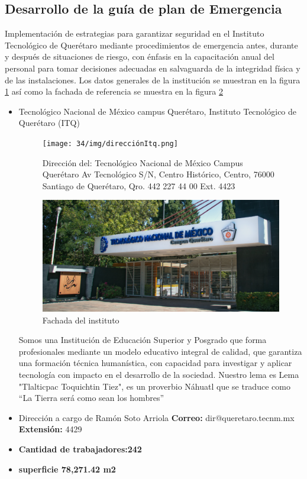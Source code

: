      \subsection{Desarrollo de la guía de plan de Emergencia}
    Implementación de estrategias para garantizar seguridad en el Instituto Tecnológico de Querétaro mediante procedimientos de emergencia antes, durante y después de situaciones de riesgo, con énfasis en la capacitación anual del personal para tomar decisiones adecuadas en salvaguarda de la integridad física y de las instalaciones. Los datos generales de la institución se muestran en la figura \ref{fig:enter-label7} así como la fachada de referencia se muestra en la figura \ref{fig:enter-label8}
    \begin{itemize}
        \item Tecnológico Nacional de México campus Querétaro, Instituto Tecnológico de Querétaro (ITQ)
    \begin{figure}[H]
        \centering
        \texttt{[image: 34/img/direcciónItq.png]}
        \caption{Dirección del: Tecnológico Nacional de México Campus Querétaro Av Tecnológico S/N, Centro Histórico, Centro, 76000 Santiago de Querétaro, Qro. 442 227 44 00 Ext. 4423}
        \label{fig:enter-label7}
    \end{figure}
    \begin{figure}[H]
        \centering
        \includegraphics[scale=0.3]{34/img/itq.png}
        \caption{Fachada del instituto}
        \label{fig:enter-label8}
    \end{figure}
    Somos una Institución de Educación Superior y Posgrado que forma profesionales mediante un modelo educativo integral de calidad, que garantiza una formación técnica humanística, con capacidad para investigar y aplicar tecnología con impacto en el desarrollo de la sociedad. Nuestro lema es Lema "Tlalticpac Toquichtin Tiez", es un proverbio Náhuatl que se traduce como “La Tierra será como sean los hombres” 
    
    \item Dirección a cargo de Ramón Soto Arriola	\textbf{Correo:} dir@queretaro.tecnm.mx	\textbf{Extensión:} 4429
    \item \textbf{Cantidad de trabajadores:242}
    \item \textbf{superficie 78,271.42 m2}
    \end{itemize}
